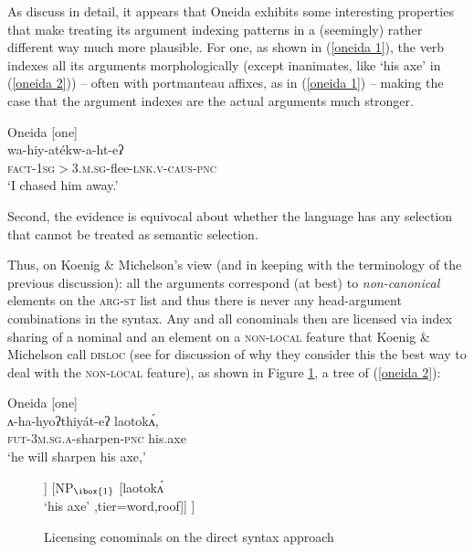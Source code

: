 \documentclass[output=paper
	        ,collection
	        ,collectionchapter
 	        ,biblatex
                ,babelshorthands
                ,newtxmath
                ,draftmode
                ,colorlinks, citecolor=brown
]{langscibook}
\begin{document}
As \citet{KM15} discuss in detail, it appears that Oneida exhibits some interesting properties that make treating its argument indexing patterns in a (seemingly) rather different way much more plausible. For one, as shown in (\ref{oneida 1}), the verb indexes all its arguments morphologically (except inanimates, like `his axe' in (\ref{oneida 2})) -- often with portmanteau affixes, as in (\ref{oneida 1}) -- making the case that the argument indexes are the actual arguments much stronger. 
%
\begin{exe}
\ex\label{oneida 1} Oneida [one] \citep[5]{KM15} \\
\gll wa-hiy-at\'{e}{\textperiodcentered}kw-a-ht-eʔ \\
\textsc{fact}-\textsc{1sg$>$3.m.sg}-flee-\textsc{lnk.v}-\textsc{caus}-\textsc{pnc} \\
\glt `I chased him away.' 
\end{exe} 
%
Second, the evidence is equivocal about whether the language has any selection that cannot be treated as semantic selection.

Thus, on Koenig \& Michelson's view (and in keeping with the terminology of the previous discussion): all the arguments correspond (at best) to \textit{non-canonical} elements on the \textsc{arg-st} list and thus there is never any head-argument combinations in the syntax. Any and all conominals then are licensed via index sharing of a nominal and an element on a \textsc{non-local} feature that Koenig \& Michelson call  \textsc{disloc} (see \citealt[39]{KM15} for discussion of why they consider this the best way to deal with  the \textsc{non-local} feature), as shown in Figure \ref{nonlocal tree}, a tree of (\ref{oneida 2}):
\begin{exe}
\ex\label{oneida 2} Oneida [one] \citep[17]{KM15} \\
\gll ʌ-ha-hyoʔthi{\textperiodcentered}y\'{a}t-eʔ laoto{\textperiodcentered}k\'{ʌ}{\textperiodcentered},\\
\textsc{fut}-\textsc{3m.sg.a}-sharpen-\textsc{pnc} his.axe \\
\glt `he will sharpen his axe,'
\end{exe} 
%
\begin{figure}[htp]
\centering
\begin{forest}
[%
\avmtmp{
	[head & verb \\
	disloc & \{ \} ]
} 
	[%
	\avmtmp{
		[head & verb \\
		disloc & \{\1\} ]
	}
		[ʌhahyoʔthi{\textperiodcentered}y\'{a}teʔ \\ `he will sharpen' , tier=word]]
	[NP$_{\ibox{1}}$ [laoto{\textperiodcentered}k\'{ʌ}{\textperiodcentered} \\ `his axe' ,tier=word,roof]]
]
\end{forest}
\caption{Licensing conominals on the direct syntax approach}
\label{nonlocal tree}
\end{figure}
 
\end{document}
